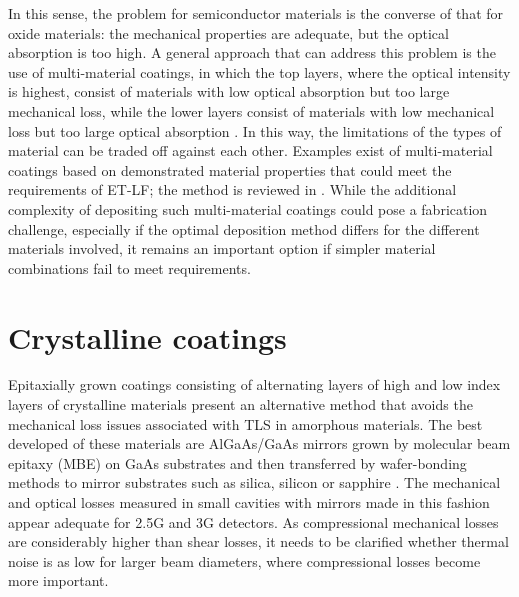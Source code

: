 In this sense, the problem for semiconductor materials is the converse of that for oxide materials: the mechanical properties are adequate, but the optical absorption is too high. A general approach that can address this problem is the use of multi-material coatings, in which the top layers, where the optical intensity is highest, consist of materials with low optical absorption but too large mechanical loss, while the lower layers consist of materials with low mechanical loss but too large optical absorption \cite{yam2015multimaterial,steinlechner2015thermal}. In this way, the limitations of the types of material can be traded off against each other. Examples exist of multi-material coatings based on demonstrated material properties that could meet the requirements of ET-LF; the method is reviewed in \cite{Craig2018ETmultimaterialDCC}. While the additional complexity of depositing such multi-material coatings could pose a fabrication challenge, especially if the optimal deposition method differs for the different materials involved, it remains an important option if simpler material combinations fail to meet requirements.

\section{Crystalline coatings}

Epitaxially grown coatings consisting of alternating layers of high and low index layers of crystalline materials present an alternative method that avoids the mechanical loss issues associated with TLS in amorphous materials. The best developed of these materials are AlGaAs/GaAs mirrors grown by molecular beam epitaxy (MBE) on GaAs substrates and then transferred by wafer-bonding methods to mirror substrates such as silica, silicon or sapphire \cite{cole2013tenfold}. The mechanical and optical losses measured in small cavities with mirrors made in this fashion appear adequate for 2.5G and 3G detectors. As compressional mechanical losses are considerably higher than shear losses, it needs to be clarified whether thermal noise is as low for larger beam diameters, where compressional losses become more important.

